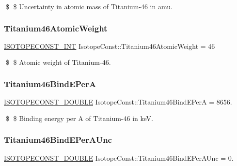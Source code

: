 \$ \$ Uncertainty in atomic mass of Titanium-\/46 in amu. \mbox{\label{group___isotope_const-_titanium-_ti46_gaaa496a67b4bf9f74beb6ccbb35dfbddb}} 
\subsubsection{\texorpdfstring{Titanium46\+Atomic\+Weight}{Titanium46AtomicWeight}}
{\footnotesize\ttfamily \mbox{\hyperlink{group___isotope_const-_macros_ga5f18360b3e99483a35c32d789e62621c}{I\+S\+O\+T\+O\+P\+E\+C\+O\+N\+S\+T\+\_\+\+I\+NT}} Isotope\+Const\+::\+Titanium46\+Atomic\+Weight = 46}

\$ \$ Atomic weight of Titanium-\/46. \mbox{\label{group___isotope_const-_titanium-_ti46_ga1df6cd7cee3509c0ccb7a6345dfb6c43}} 
\subsubsection{\texorpdfstring{Titanium46\+Bind\+E\+PerA}{Titanium46BindEPerA}}
{\footnotesize\ttfamily \mbox{\hyperlink{group___isotope_const-_macros_ga8f45a7272ce02c0b4c65c44636ed719a}{I\+S\+O\+T\+O\+P\+E\+C\+O\+N\+S\+T\+\_\+\+D\+O\+U\+B\+LE}} Isotope\+Const\+::\+Titanium46\+Bind\+E\+PerA = 8656.}

\$ \$ Binding energy per A of Titanium-\/46 in keV. \mbox{\label{group___isotope_const-_titanium-_ti46_gabc01647323a98b2fef21d57ea203fd58}} 
\subsubsection{\texorpdfstring{Titanium46\+Bind\+E\+Per\+A\+Unc}{Titanium46BindEPerAUnc}}
{\footnotesize\ttfamily \mbox{\hyperlink{group___isotope_const-_macros_ga8f45a7272ce02c0b4c65c44636ed719a}{I\+S\+O\+T\+O\+P\+E\+C\+O\+N\+S\+T\+\_\+\+D\+O\+U\+B\+LE}} Isotope\+Const\+::\+Titanium46\+Bind\+E\+Per\+A\+Unc = 0.}

